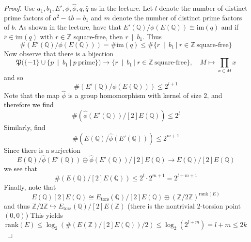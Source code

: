 \documentclass{scrartcl}
\newcommand{\Z}{\mathbb{Z}}
\newcommand{\Q}{\mathbb{Q}}
\newcommand{\im}{\mathrm{im}}
\newcommand{\divides}{\ \mid \ }
\theoremstyle{definition}
\begin{document}
\begin{proof}
    Use $a_1, b_1, E', \phi, \hat{\phi}, q, \hat{q}$ as in the lecture.
    Let $l$ denote the number of distinct prime factors of $a^2 - 4b = b_1$ and $m$ denote the number of distinct prime factors of $b$.
    As shown in the lecture, have that $E'(\Q)/\phi(E(\Q)) \cong \im(q)$ and if $\overline{r} \in \im(q)$ with $r \in \Z$ square-free, then $r \divides b_1$.
    Thus
    \begin{equation*}
        \#(E'(\Q)/\phi(E(\Q))) = \#\im(q) \leq \#\{ r \divides b_1 \ | \ r \in \Z \ \text{square-free}\}
    \end{equation*}
    Now observe that there is a bijection
    \begin{equation*}
        \mathfrak{P}(\{ -1 \} \cup \{ p \divides b_1 \ | \ p \ \text{prime}\}) \to \{ r \divides b_1 \ | \ r \in \Z \ \text{square-free} \}, \quad M \mapsto \prod_{x \in M} x
    \end{equation*}
    and so
    \begin{equation*}
        \#(E'(\Q)/\phi(E(\Q))) \leq 2^{l + 1}
    \end{equation*}
    Note that the map $\hat{\phi}$ is a group homomorphism with kernel of size 2, and therefore we find
    \begin{equation*}
        \#(\hat{\phi}(E'(\Q))/[2]E(\Q)) \leq 2^l
    \end{equation*}
    Similarly, find
    \begin{equation*}
        \#(E(\Q)/\hat{\phi}(E'(\Q))) \leq 2^{m + 1}
    \end{equation*}
    Since there is a surjection
    \begin{equation*}
        E(\Q)/\hat{\phi}(E'(\Q)) \oplus \hat{\phi}(E'(\Q))/[2]E(\Q) \to E(\Q)/[2]E(\Q)
    \end{equation*}
    we see that
    \begin{equation*}
        \#(E(\Q)/[2]E(\Q)) \leq 2^l \cdot 2^{m + 1} = 2^{l + m + 1}
    \end{equation*}
    Finally, note that
    \begin{equation*}
        E(\Q)[2]E(\Q) \cong E_{\mathrm{tors}}(\Q)/[2]E(\Q) \oplus (\Z/2\Z)^{\mathrm{rank}(E)}
    \end{equation*}
    and thus $\Z/2\Z \hookrightarrow E_{\mathrm{tors}}(\Q)/[2]E(\Z)$ (there is the nontrivial 2-torsion point $(0, 0)$)
    This yields
    \begin{equation*}
        \mathrm{rank}(E) \leq \log_2(\#(E(\Z)/[2]E(\Q)) / 2) \leq \log_2(2^{l + m}) = l + m \leq 2k
    \end{equation*}


\end{proof}
\end{document}
